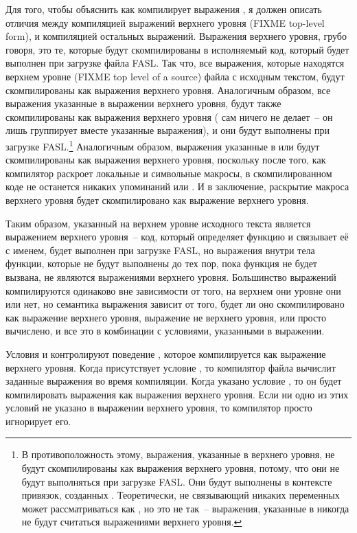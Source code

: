 Для того, чтобы объяснить как  компилирует выражения ,
я должен описать отличия между компиляцией выражений верхнего уровня (FIXME top-level
form), и компиляцией остальных выражений.  Выражения верхнего уровня, грубо говоря, это
те, которые будут скомпилированы в исполняемый код, который будет выполнен при загрузке
файла FASL.  Так что, все выражения, которые находятся верхнем уровне (FIXME top level of
a source) файла с исходным текстом, будут скомпилированы как выражения верхнего
уровня. Аналогичным образом, все выражения указанные в выражении  верхнего
уровня, будут также скомпилированы как выражения верхнего уровня ( сам ничего
не делает~-- он лишь группирует вместе указанные выражения), и они будут выполнены при
загрузке FASL.\footnote{В противоположность этому, выражения, указанные в 
  верхнего уровня, не будут скомпилированы как выражения верхнего уровня, потому, что они
  не будут выполняться при загрузке FASL.  Они будут выполнены в контексте привязок,
  созданных . Теоретически,  не связывающий никаких переменных может
  рассматриваться как , но это не так~-- выражения, указанные в 
  никогда не будут считаться выражениями верхнего уровня.}  Аналогичным образом, выражения
указанные в  или  будут скомпилированы как выражения
верхнего уровня, поскольку после того, как компилятор раскроет локальные и символьные
макросы, в скомпилированном коде не останется никаких упоминаний  или
.  И в заключение, раскрытие макроса верхнего уровня будет
скомпилировано как выражение верхнего уровня.

Таким образом,  указанный на верхнем уровне исходного текста является
выражением верхнего уровня~-- код, который определяет функцию и связывает её с именем,
будет выполнен при загрузке FASL, но выражения внутри тела функции, которые не будут
выполнены до тех пор, пока функция не будет вызвана, не являются выражениями верхнего
уровня.  Большинство выражений компилируются одинаково вне зависимости от того, на верхнем
они уровне они или нет, но семантика выражения  зависит от того, будет ли
оно скомпилировано как выражение верхнего уровня, выражение не верхнего уровня, или просто
вычислено, и все это в комбинации с условиями, указанными в выражении.

Условия  и  контролируют поведение
, которое компилируется как выражение верхнего уровня.  Когда присутствует
условие , то компилятор файла вычислит заданные выражения во время
компиляции.  Когда указано условие , то он будет компилировать
выражения как выражения верхнего уровня.  Если ни одно из этих условий не указано в
выражении  верхнего уровня, то компилятор просто игнорирует его.

